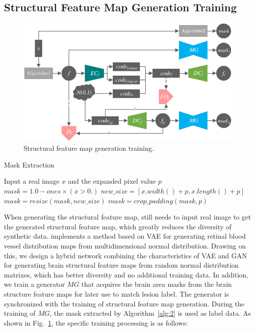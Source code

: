 \documentclass[letterpaper]{article} %
\begin{document}
\subsection{Structural Feature Map Generation Training}
\begin{figure}
	\centering
	\includegraphics[width=0.95\columnwidth]{figures/feature_train}
	\caption{Structural feature map generation training.}
	\label{feature_train}
\end{figure}
\begin{algorithm}
	\caption{Mask Extraction}
	\label{alg:2}
	\begin{algorithmic}[1]
		\State Input a real image $x$ and the expanded pixel value $p$
		\State $mask = 1.0 - ones \times (x > 0.)$
		\State $new\_size=[x.width() + p, x.length() + p]$
		\State $mask = resize(mask, new\_size)$
		\State $mask = crop\_padding(mask,p)$
	\end{algorithmic}  
\end{algorithm}
When generating the structural feature map, \cite{4shin2018medical} still needs to input real image to get the generated structural feature map, which greatly reduces the diversity of synthetic data. \cite{41costa2017towards} implements a method based on VAE for generating retinal blood vessel distribution maps from multidimensional normal distribution. Drawing on this, we design a hybrid network combining the characteristics of VAE and GAN for generating brain structural feature maps from random normal distribution matrixes, which has better diversity and no additional training data. In addition, we train a generator $MG$ that acquires the brain area masks from the brain structure feature maps for later use to match lesion label. The generator is synchronized with the training of structural feature map generation. During the training of $MG$, the mask extracted by Algorithm~\ref{alg:2} is used as label data. As shown in Fig.~\ref{feature_train}, the specific training processing is as follows:
\end{document}
